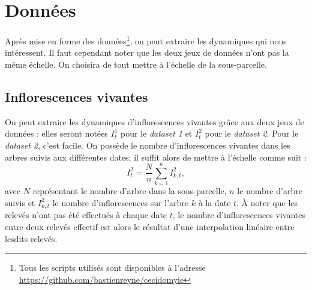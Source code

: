 \section{Données}

Après mise en forme des données\footnote{Tous les scripts utilisés sont disponibles à l'adresse \url{https://github.com/bastienreyne/cecidomyie}}, on peut extraire les dynamiques qui nous intéressent.
Il faut cependant noter que les deux jeux de données n'ont pas la même échelle.
On choisira de tout mettre à l'échelle de la sous-parcelle.

\subsection{Inflorescences vivantes}

On peut extraire les dynamiques d'inflorescences vivantes grâce aux deux jeux de données : elles seront notées $I^1_t$ pour le \emph{dataset 1} et $I^2_t$ pour le \emph{dataset 2}.
Pour le \emph{dataset 2}, c'est facile. 
On possède le nombre d'inflorescences vivantes dans les arbres suivis aux différentes dates; il suffit alors de mettre à l'échelle comme suit :
\[
I_{t}^{2} = \frac{N}{n}\sum_{k=1}^{n} I^{2}_{k, t},
\]
avec $N$ représentant le nombre d'arbre dans la sous-parcelle, $n$ le nombre d'arbre suivis et $I^{2}_{k, t}$ le nombre d'inflorescences sur l'arbre $k$ à la date $t$.
À noter que les relevés n'ont pas été effectués à chaque date $t$, le nombre d'inflorescences vivantes entre deux relevés effectif est alors le résultat d'une interpolation linéaire entre lesdits relevés.

